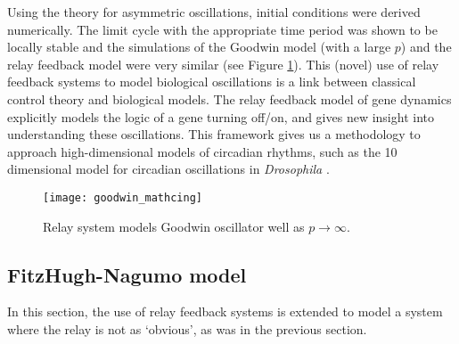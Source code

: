 \documentclass[a4paper, 12pt]{article}
\begin{document}
Using the theory for asymmetric oscillations, initial conditions were derived numerically. The limit cycle with the appropriate time period was shown to be locally stable and the simulations of the Goodwin model (with a large $p$) and the relay feedback model were very similar (see Figure \ref{goodwin_matching}). This (novel) use of relay feedback systems to model biological oscillations is a link between classical control theory and biological models. The relay feedback model of gene dynamics explicitly models the logic of a gene turning off/on, and gives new insight into understanding these oscillations. This framework  gives us a methodology to approach high-dimensional models of circadian rhythms, such as the 10 dimensional model for circadian  oscillations in \textit{Drosophila} \cite{leloup}. 

\begin{figure}[h!]
\texttt{[image: goodwin\_mathcing]}
\caption{Relay system models Goodwin oscillator well as $p\rightarrow\infty$.}
\label{goodwin_matching}
\end{figure}

\FloatBarrier
\subsection{FitzHugh-Nagumo model}
In this section, the use of relay feedback systems is extended to model a system where the relay is not as `obvious', as was in the previous section.
\end{document}
